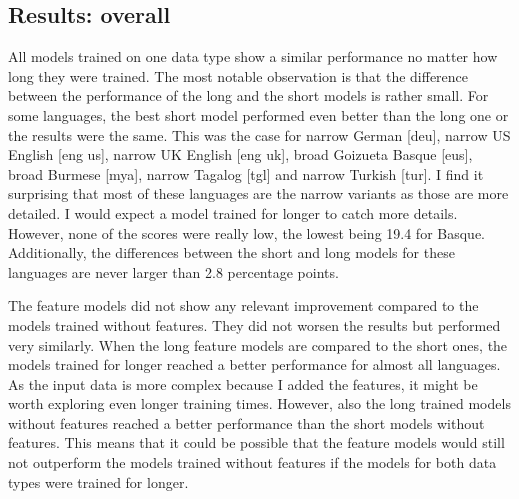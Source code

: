 \subsection{Results: overall}
All models trained on one data type show a similar performance no matter how long they were trained. The most notable observation is that the difference between the performance of the long and the short models is rather small. For some languages, the best short model performed even better than the long one or the results were the same. This was the case for narrow German [deu], narrow US English [eng us], narrow UK English [eng uk], broad Goizueta Basque [eus], broad Burmese [mya], narrow Tagalog [tgl] and narrow Turkish [tur]. I find it surprising that most of these languages are the narrow variants as those are more detailed. I would expect a model trained for longer to catch more details. However, none of the scores were really low, the lowest being 19.4 for Basque. Additionally, the differences between the short and long models for these languages are never larger than 2.8 percentage points.

The feature models did not show any relevant improvement compared to the models trained without features. They did not worsen the results but performed very similarly. When the long feature models are compared to the short ones, the models trained for longer reached a better performance for almost all languages. As the input data is more complex because I added the features, it might be worth exploring even longer training times. However, also the long trained models without features reached a better performance than the short models without features. This means that it could be possible that the feature models would still not outperform the models trained without features if the models for both data types were trained for longer. 





